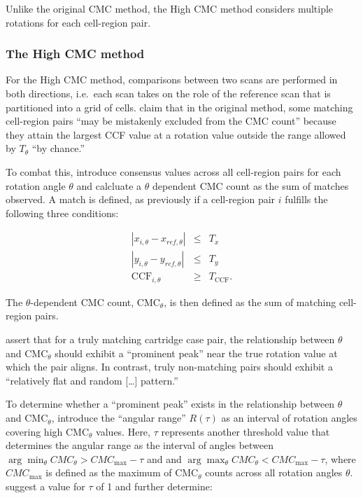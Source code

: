 Unlike the original CMC method, the High CMC method considers multiple
rotations for each cell-region pair.

\hypertarget{highCMCMethod}{%
\subsubsection{The High CMC method}\label{highCMCMethod}}

For the High CMC method, comparisons between two scans are performed in
both directions, i.e.~each scan takes on the role of the reference scan
that is partitioned into a grid of cells. \citet{tong_improved_2015}
claim that in the original method, some matching cell-region pairs ``may
be mistakenly excluded from the CMC count'' because they attain the
largest CCF value at a rotation value outside the range allowed by
\(T_\theta\) ``by chance.''

To combat this, \citet{tong_improved_2015} introduce consensus values
across all cell-region pairs for each rotation angle \(\theta\) and
calcluate a \(\theta\) dependent CMC count as the sum of matches
observed. A match is defined, as previously if a cell-region pair \(i\)
fulfills the following three conditions:

\begin{eqnarray}\label{eqn:high-cmc}
|x_{i,\theta} - x_{ref,\theta}| &\leq& T_x \\ \nonumber
|y_{i,\theta} - y_{ref,\theta}| &\leq& T_y \\ \nonumber
\text{CCF}_{i,\theta} &\geq& T_{\text{CCF}}.
\end{eqnarray}

The \(\theta\)-dependent CMC count, CMC\(_\theta\), is then defined as
the sum of matching cell-region pairs.

\citet{tong_improved_2015} assert that for a truly matching cartridge
case pair, the relationship between \(\theta\) and CMC\(_\theta\) should
exhibit a ``prominent peak'' near the true rotation value at which the
pair aligns. In contrast, truly non-matching pairs should exhibit a
``relatively flat and random {[}\ldots{]} pattern.''

To determine whether a ``prominent peak'' exists in the relationship
between \(\theta\) and CMC\(_\theta\), \citet{tong_improved_2015}
introduce the ``angular range'' \(R (\tau)\) as an interval of rotation
angles covering high CMC\(_\theta\) values. Here, \(\tau\) represents
another threshold value that determines the angular range as the
interval of angles between
\(\arg \min_\theta CMC_\theta > CMC_{\text{max}} - \tau\) and and
\(\arg \max_\theta CMC_\theta < CMC_{\text{max}} - \tau\), where
\(CMC_{\text{max}}\) is defined as the maximum of CMC\(_\theta\) counts
across all rotation angles \(\theta\). \citet{tong_improved_2015}
suggest a value for \(\tau\) of 1 and further determine:

